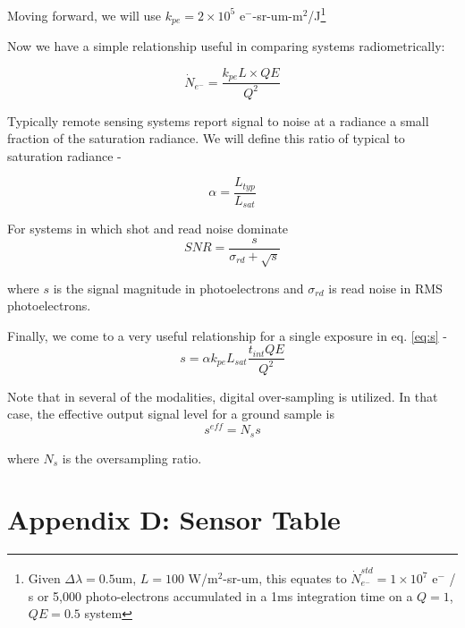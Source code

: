 \documentclass[]{spieman}  %
\begin{document}
Moving forward, we will use $k_{pe} = 2\times 10^5$ e$^-$-sr-um-m$^2$/J\footnote{Given $\Delta \lambda = 0.5$um, $L = 100$ W/m$^2$-sr-um, this equates to $\dot{N}_{e^-}^{std} = 1\times 10^7$ e$^-$ / s or 5,000 photo-electrons accumulated in a 1ms integration time on a $Q=1$, $QE=0.5$ system}

Now we have a simple relationship useful in comparing systems radiometrically:

\begin{equation}
\dot{N}_{e^-} = \frac{k_{pe} L \times QE}{Q^2}
\label{eq:N_e_dot}
\end{equation}

Typically remote sensing systems report signal to noise at a radiance a small fraction of the saturation radiance.  We will define this ratio of typical to saturation radiance - 

\begin{equation}
\alpha = \frac{L_{typ}}{L_{sat}}
\label{eq:alpha}
\end{equation}

For systems in which shot and read noise dominate
\begin{equation}
SNR = \frac{s}{\sigma_{rd} + \sqrt{s}}
\label{eq:snr}
\end{equation}

where $s$ is the signal magnitude in photoelectrons and $\sigma_{rd}$ is read noise in RMS photoelectrons.

Finally, we come to a very useful relationship for a single exposure in eq. \eqref{eq:s} -
\begin{equation}
s = \alpha k_{pe}L_{sat} \frac{t_{int}QE}{Q^2}
\label{eq:s}
\end{equation}

Note that in several of the modalities, digital over-sampling is utilized.  In that case, the effective output signal level for a ground sample is 
\begin{equation*}
    s^{eff} = N_s s
\end{equation*}

where $N_s$ is the oversampling ratio.

\section{Appendix D: Sensor Table}
\label{sec:appendix_d}




\end{document}
